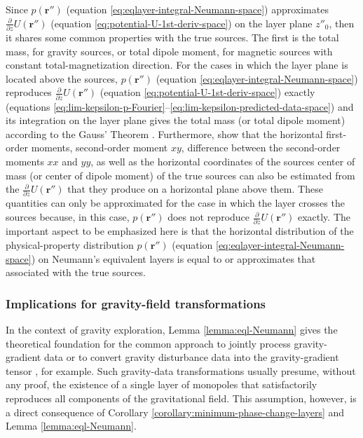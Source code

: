 Since $p(\mathbf{r}'')$ (equation \ref{eq:eqlayer-integral-Neumann-space}) approximates 
$\tfrac{\partial}{\partial z} U(\mathbf{r}'')$ (equation \ref{eq:potential-U-1st-deriv-space}) on the 
layer plane $z''_{0}$, then it shares some common properties with the true sources.
The first is the total mass, for gravity sources, or total dipole moment, for magnetic sources with
constant total-magnetization direction.
For the cases in which the layer plane is located above the sources, $p(\mathbf{r}'')$ (equation \ref{eq:eqlayer-integral-Neumann-space})
reproduces $\tfrac{\partial}{\partial z} U(\mathbf{r}'')$ (equation \ref{eq:potential-U-1st-deriv-space}) exactly 
(equations \ref{eq:lim-kepsilon-p-Fourier}--\ref{eq:lim-kepsilon-predicted-data-space}) 
and its integration on the layer plane gives the total mass (or total dipole moment) according to the
Gauss' Theorem \citep[e.g.,][]{hammer1945, lafehr1965, bhattacharyya1967}. 
Furthermore, \citet{medeiros-silva1995a} show that the horizontal first-order moments, second-order moment $xy$, 
difference between the second-order moments $xx$ and $yy$, as well as the horizontal coordinates of the sources center of mass
(or center of dipole moment) of the true sources can also be estimated from the $\tfrac{\partial}{\partial z} U(\mathbf{r}'')$
that they produce on a horizontal plane above them.
These quantities can only be approximated for the case in which the layer crosses the sources because, in this case,
$p(\mathbf{r}'')$ does not reproduce $\tfrac{\partial}{\partial z} U(\mathbf{r}'')$ exactly.
The important aspect to be emphasized here is that the horizontal distribution of the physical-property distribution $p(\mathbf{r}'')$
(equation \ref{eq:eqlayer-integral-Neumann-space}) on Neumann's equivalent layers is equal to or approximates 
that associated with the true sources.

\subsubsection{Implications for gravity-field transformations}

In the context of gravity exploration, Lemma \ref{lemma:eql-Neumann} gives the 
theoretical foundation for the common approach to jointly process gravity-gradient data 
\cite[e.g.,][]{barnes_lumley2011} or to convert gravity disturbance data into the 
gravity-gradient tensor \cite[e.g.,][]{piauilino_etal2019_seg, oliveirajr_etal2023}, for example.
Such gravity-data transformations usually presume, without any proof, the existence of a single layer of 
monopoles that satisfactorily reproduces all components of the gravitational field.
This assumption, however, is a direct consequence of 
Corollary \ref{corollary:minimum-phase-change-layers} and Lemma \ref{lemma:eql-Neumann}.

